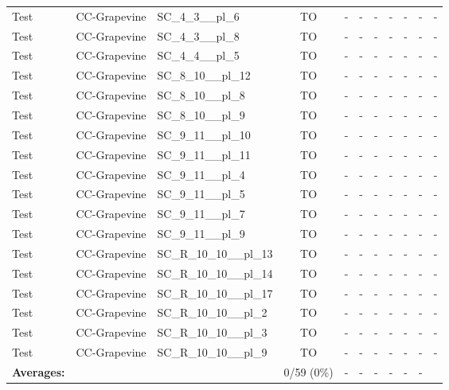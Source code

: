 \documentclass{article}
\begin{document}
\begin{tabular}{lllcccccccc}
Test & CC-Grapevine & SC\_4\_3\_\_pl\_6 & TO & - & - & - & - & - & - & - \\
Test & CC-Grapevine & SC\_4\_3\_\_pl\_8 & TO & - & - & - & - & - & - & - \\
Test & CC-Grapevine & SC\_4\_4\_\_pl\_5 & TO & - & - & - & - & - & - & - \\
Test & CC-Grapevine & SC\_8\_10\_\_pl\_12 & TO & - & - & - & - & - & - & - \\
Test & CC-Grapevine & SC\_8\_10\_\_pl\_8 & TO & - & - & - & - & - & - & - \\
Test & CC-Grapevine & SC\_8\_10\_\_pl\_9 & TO & - & - & - & - & - & - & - \\
Test & CC-Grapevine & SC\_9\_11\_\_pl\_10 & TO & - & - & - & - & - & - & - \\
Test & CC-Grapevine & SC\_9\_11\_\_pl\_11 & TO & - & - & - & - & - & - & - \\
Test & CC-Grapevine & SC\_9\_11\_\_pl\_4 & TO & - & - & - & - & - & - & - \\
Test & CC-Grapevine & SC\_9\_11\_\_pl\_5 & TO & - & - & - & - & - & - & - \\
Test & CC-Grapevine & SC\_9\_11\_\_pl\_7 & TO & - & - & - & - & - & - & - \\
Test & CC-Grapevine & SC\_9\_11\_\_pl\_9 & TO & - & - & - & - & - & - & - \\
Test & CC-Grapevine & SC\_R\_10\_10\_\_pl\_13 & TO & - & - & - & - & - & - & - \\
Test & CC-Grapevine & SC\_R\_10\_10\_\_pl\_14 & TO & - & - & - & - & - & - & - \\
Test & CC-Grapevine & SC\_R\_10\_10\_\_pl\_17 & TO & - & - & - & - & - & - & - \\
Test & CC-Grapevine & SC\_R\_10\_10\_\_pl\_2 & TO & - & - & - & - & - & - & - \\
Test & CC-Grapevine & SC\_R\_10\_10\_\_pl\_3 & TO & - & - & - & - & - & - & - \\
Test & CC-Grapevine & SC\_R\_10\_10\_\_pl\_9 & TO & - & - & - & - & - & - & - \\
\textbf{Averages:} & & & 0/59 (0\%) & - & - & - & - & - & - & \\
\bottomrule
\end{tabular}
\newpage
\end{document}
